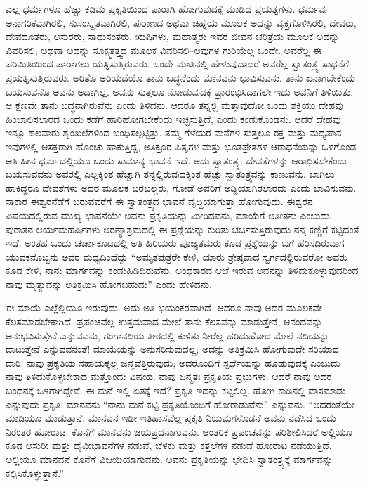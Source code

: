 \vskip 2pt

ಎಲ್ಲ ಧರ್ಮಗಳೂ ಹೆಚ್ಚು ಕಡಿಮೆ ಪ್ರಕೃತಿಯಿಂದ ಪಾರಾಗಿ ಹೋಗುವುದಕ್ಕೆ ಮಾಡಿದ ಪ್ರಯತ್ನಗಳು. ಧರ್ಮವು ಅನಾಗರಿಕವಾಗಿರಲಿ, ಸುಸಂಸ್ಕೃತವಾಗಿರಲಿ, ಪುರಾಣದ ಅಥವಾ ಚಿಹ್ನೆಯ ಮೂಲಕ ಅದನ್ನು ವ್ಯಕ್ತಗೊಳಿಸಿರಲಿ, ದೇವರು, ದೇವದೂತರು, ಅಸುರರು, ಸಾಧುಸಂತರು, ಋಷಿಗಳು, ಮಹಾತ್ಮರು ಇವರ ಜೀವನ ಚರಿತ್ರೆಯ ಮೂಲಕ ಅದನ್ನು ವಿವರಿಸಲಿ, ಅಥವಾ ಅದನ್ನು ಸೂಕ್ಷ್ಮತತ್ತ್ವದ ಮೂಲಕ ವಿವರಿಸಲಿ–ಅವುಗಳ ಗುರಿಯೆಲ್ಲ ಒಂದೇ. ಅವರೆಲ್ಲ ಈ ಪರಿಮಿತಿಯಿಂದ ಪಾರಾಗಲು ಯತ್ನಿಸುತ್ತಿರುವರು. ಒಂದೇ ಮಾತಿನಲ್ಲಿ ಹೇಳುವುದಾದರೆ ಅವರೆಲ್ಲ ಸ್ವಾತಂತ್ರ್ಯ ಸಾಧನೆಗೆ ಪ್ರಯತ್ನಿಸುತ್ತಿರುವರು. ಅರಿತೊ ಅರಿಯದೆಯೊ ತಾನು ಬದ್ಧನೆಂದು ಮಾನವನು ಭಾವಿಸುವನು. ತಾನು ಏನಾಗಬೇಕೆಂದು ಬಯಸುವನೊ ಅವನು ಅದಾಗಿಲ್ಲ. ಅವನು ಸುತ್ತಲೂ ನೋಡುವುದಕ್ಕೆ ಪ್ರಾರಂಭಿಸಿದಾಗಲೇ ಇದು ಅವನಿಗೆ ತಿಳಿಯಿತು. ಆ ಕ್ಷಣವೇ ತಾನು ಬದ್ಧನಾಗಿರುವೆನು ಎಂದು ತಿಳಿದನು. ಆದರೂ ತನ್ನಲ್ಲಿ ಮತ್ತಾವುದೋ ಒಂದು ಶಕ್ತಿಯು ದೇಹವು ಹಿಂಬಾಲಿಸಲಾರದ ಒಂದು ಕಡೆಗೆ ಹಾರಿಹೋಗಬೇಕೆಂದು ಇಚ್ಛಿಸುತ್ತಿದೆ, ಎಂದು ಕಂಡುಕೊಂಡನು. ಆದರೆ ದೇಹವು ಇನ್ನೂ ಹಲವಾರು ಶೃಂಖಲೆಗಳಿಂದ ಬಂಧಿಸಲ್ಪಟ್ಟಿತ್ತು. ತಮ್ಮ ಗೆಳೆಯರ ಮನೆಗಳ ಸುತ್ತಲೂ ರಕ್ತ ಮತ್ತು ಮದ್ಯಪಾನ–ಇವುಗಳಲ್ಲಿ ಆಸಕ್ತರಾಗಿ ಹೊಂಚು ಹಾಕುತ್ತಿದ್ದ, ಅತಿಕ್ರೂರ ಪಿತೃಗಳ ಮತ್ತು ಭೂತಪ್ರೇತಗಳ ಆರಾಧನೆಯನ್ನು ಒಳಗೊಂಡ ಅತಿ ಹೀನ ಧರ್ಮದಲ್ಲಿಯೂ ಒಂದು ಸಾಮಾನ್ಯ ಭಾವನೆ ಇದೆ. ಅದು ಸ್ವಾತಂತ್ರ್ಯ. ದೇವತೆಗಳನ್ನು ಆರಾಧಿಸಬೇಕೆಂದು ಬಯಸುವವನು ಅವರಲ್ಲಿ ಎಲ್ಲಕ್ಕಿಂತ ಹೆಚ್ಚಾಗಿ ತನ್ನಲ್ಲಿರುವುದಕ್ಕಿಂತ ಹೆಚ್ಚು ಸ್ವಾತಂತ್ರ್ಯವನ್ನು ಕಾಣುವನು. ಬಾಗಿಲು ಹಾಕಿದ್ದರೂ ದೇವತೆಗಳು ಅದರ ಮೂಲಕ ಬರಬಲ್ಲರು, ಗೋಡೆ ಅವರಿಗೆ ಅಡ್ಡಿಯಾಗಿರಲಾರದು ಎಂದು ಭಾವಿಸುವನು. ಸಾಕಾರ ಈಶ್ವರನೆಡೆಗೆ ಬರುವವರೆಗೆ ಈ ಸ್ವಾತಂತ್ರ್ಯದ ಭಾವನೆ ವೃದ್ಧಿಯಾಗುತ್ತಾ ಹೋಗುವುದು. ಈಶ್ವರನ ವಿಷಯದಲ್ಲಿರುವ ಮುಖ್ಯ ಭಾವನೆಯೇ ಅವನು ಪ್ರಕೃತಿಯನ್ನು ಮೀರಿದವನು, ಮಾಯೆಗೆ ಅತೀತನು ಎಂಬುದು. ಪುರಾತನ ಆರ್ಯಮಹರ್ಷಿಗಳು ಅರಣ್ಯಾಶ್ರಮದಲ್ಲಿ ಈ ಪ್ರಶ್ನೆಯನ್ನು ಕುರಿತು ಚರ್ಚಿಸುತ್ತಿರುವುದು ನನ್ನ ಕಣ್ಣಿಗೆ ಕಟ್ಟಿದಂತೆ ಇದೆ. ಅಂತಹ ಒಂದು ಚರ್ಚಾಕೂಟದಲ್ಲಿ ಅತಿ ಹಿರಿಯರು ಪೂಜ್ಯತಮರು ಕೂಡ ಪ್ರಶ್ನೆಯನ್ನು ಬಗೆ ಹರಿಸದಿರುವಾಗ ಯುವಕನೊಬ್ಬನು ಅವರ ಮಧ್ಯದಿಂದೆದ್ದು “ಅಮೃತಪುತ್ರರೇ ಕೇಳಿ, ಯಾರು ಶ್ರೇಷ್ಠವಾದ ಸ್ವರ್ಗದಲ್ಲಿರುವರೋ ಅವರು ಕೂಡ ಕೇಳಿ, ನಾನು ಮಾರ್ಗವನ್ನು ಕಂಡುಹಿಡಿದಿರುವೆನು. ಅಂಧಕಾರದ ಆಚೆ ಇರುವ ಅವನನ್ನು ತಿಳಿದುಕೊಳ್ಳುವುದರಿಂದ ನಾವು ಮೃತ್ಯುವನ್ನು ಅತಿಕ್ರಮಿಸಿ ಹೋಗಬಹುದು” ಎಂದು ಹೇಳಿದನು.

\vskip 0.2cm

ಈ ಮಾಯೆ ಎಲ್ಲೆಲ್ಲಿಯೂ ಇರುವುದು. ಅದು ಅತಿ ಭಯಂಕರವಾಗಿದೆ. ಆದರೂ ನಾವು ಅದರ ಮೂಲಕವೇ ಕೆಲಸಮಾಡಬೇಕಾಗಿದೆ. ಪ್ರಪಂಚವೆಲ್ಲ ಉತ್ತಮವಾದ ಮೇಲೆ ತಾನು ಕೆಲಸವನ್ನು ಮಾಡುತ್ತೇನೆ, ಆನಂದವನ್ನು ಅನುಭವಿಸುತ್ತೇನೆ ಎನ್ನುವವನು, ಗಂಗಾನದಿಯ ತೀರದಲ್ಲಿ ಕುಳಿತು ನೀರೆಲ್ಲ ಹರಿದುಹೋದ ಮೇಲೆ ನದಿಯನ್ನು ದಾಟುತ್ತೇನೆ ಎನ್ನುವವನಂತೆ! ಮಾಯೆಯನ್ನು ಅನುಸರಿಸುವುದಲ್ಲ; ಅದನ್ನು ಅತಿಕ್ರಮಿಸಿ ಹೋಗುವುದೇ ಸರಿಯಾದ ದಾರಿ. ನಾವು ಪ್ರಕೃತಿಯ ಸಹಾಯಕ್ಕಲ್ಲ ಜನ್ಮವೆತ್ತಿರುವುದು; ಅದರೊಂದಿಗೆ ಸ್ಪರ್ಧೆಯನ್ನು ಹೂಡುವುದಕ್ಕೆ ಎಂಬುದು ನಾವು ತಿಳಿದುಕೊಳ್ಳಬೇಕಾದ ಮತ್ತೊಂದು ವಿಷಯ. ನಾವು ಜನ್ಮತಃ ಪ್ರಕೃತಿಯ ಪ್ರಭುಗಳು. ಆದರೆ ನಾವು ಅದರ ಬಂಧನಕ್ಕೆ ಒಳಗಾಗಿದ್ದೇವೆ. ಈ ಮನೆ ಇಲ್ಲಿ ಏತಕ್ಕೆ ಇದೆ? ಪ್ರಕೃತಿ ಇದನ್ನು ಕಟ್ಟಲಿಲ್ಲ. ಹೋಗಿ ಕಾಡಿನಲ್ಲಿ ವಾಸಮಾಡು ಎನ್ನುವುದು ಪ್ರಕೃತಿ. ಮಾನವನು “ನಾನು ಮನೆ ಕಟ್ಟಿ ಪ್ರಕೃತಿಯೊಂದಿಗೆ ಹೋರಾಡುವೆನು” ಎನ್ನುವನು. “ಅದರಂತೆಯೇ ಮಾಡಿಯೂ ಮಾಡುತ್ತಾನೆ. ಮಾನವನ ಇಡೀ ಇತಿಹಾಸವೆಲ್ಲ ಪ್ರಕೃತಿ ನಿಯಮಗಳೊಡನೆ ಅವನು ನಡೆಸಿದ ಒಂದು ನಿರಂತರ ಹೋರಾಟ. ಕೊನೆಗೆ ಮಾನವನು ಜಯಪ್ರದನಾಗುವನು. ಆಂತರಿಕ ಪ್ರಪಂಚವನ್ನು ಪರಿಶೀಲಿಸಿದರೆ ಅಲ್ಲಿಯೂ ಕೂಡ ಆಸುರೀ ಮತ್ತು ದೈವೀಭಾವನೆಗಳ ನಡುವೆ, ಬೆಳಕು ಮತ್ತು ಕತ್ತಲೆಗಳ ನಡುವೆ ಹೋರಾಟ ನಡೆಯುತ್ತಿದೆ. ಅಲ್ಲಿಯೂ ಮಾನವನೆ ಕೊನೆಗೆ ವಿಜಯಿಯಾಗುವನು. ಅವನು ಪ್ರಕೃತಿಯನ್ನು ಭೇದಿಸಿ ಸ್ವಾತಂತ್ರ್ಯಕ್ಕೆ ಮಾರ್ಗವನ್ನು ಕಲ್ಪಿಸಿಕೊಳ್ಳುತ್ತಾನೆ.”

